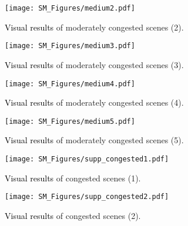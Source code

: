 \documentclass[10pt,twocolumn,letterpaper]{article}
\newcommand{\ywu}[1]{\textcolor{black}{#1}}
\begin{document}
\begin{figure*}[t!] 
\vspace{-1.0em}
  \centering
  \texttt{[image: SM\_Figures/medium2.pdf]}
  \caption{\ywu{Visual results} of moderately congested scenes (2).}
  \label{supp_fig6} 
  \vspace{-1.5em}
\end{figure*}

\begin{figure*}[t!] 
\vspace{-1.0em}
  \centering
  \texttt{[image: SM\_Figures/medium3.pdf]}
  \caption{\ywu{Visual results} of moderately congested scenes (3).}
  \label{supp_fig7} 
  \vspace{-1.5em}
\end{figure*}

\begin{figure*}[t!] 
\vspace{-1.0em}
  \centering
  \texttt{[image: SM\_Figures/medium4.pdf]}
  \caption{\ywu{Visual results} of moderately congested scenes (4).}
  \label{supp_fig8} 
  \vspace{-1.5em}
\end{figure*}

\begin{figure*}[t!] 
\vspace{-1.0em}
  \centering
  \texttt{[image: SM\_Figures/medium5.pdf]}
  \caption{\ywu{Visual results} of moderately congested scenes (5).}
  \label{supp_fig9} 
  \vspace{-1.5em}
\end{figure*}

\begin{figure*}[t!] 
\vspace{-1.0em}
  \centering
  \texttt{[image: SM\_Figures/supp\_congested1.pdf]}
  \caption{\ywu{Visual results} of congested scenes (1).}
  \label{supp_fig10} 
  \vspace{-1.5em}
\end{figure*}

\begin{figure*}[t!] 
\vspace{-1.0em}
  \centering
  \texttt{[image: SM\_Figures/supp\_congested2.pdf]}
  \caption{\ywu{Visual results} of congested scenes (2).}
  \label{supp_fig11} 
  \vspace{-1.5em}
\end{figure*}
\end{document}
